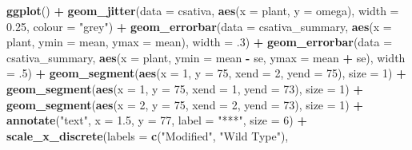 \documentclass[
]{book}
\newenvironment{Shaded}{\begin{snugshade}}{\end{snugshade}}
\newcommand{\DataTypeTok}[1]{\textcolor[rgb]{0.13,0.29,0.53}{#1}}
\newcommand{\DecValTok}[1]{\textcolor[rgb]{0.00,0.00,0.81}{#1}}
\newcommand{\FloatTok}[1]{\textcolor[rgb]{0.00,0.00,0.81}{#1}}
\newcommand{\KeywordTok}[1]{\textcolor[rgb]{0.13,0.29,0.53}{\textbf{#1}}}
\newcommand{\NormalTok}[1]{#1}
\newcommand{\OperatorTok}[1]{\textcolor[rgb]{0.81,0.36,0.00}{\textbf{#1}}}
\newcommand{\StringTok}[1]{\textcolor[rgb]{0.31,0.60,0.02}{#1}}
\begin{document}
\begin{Shaded}
\begin{Highlighting}[]
\KeywordTok{ggplot}\NormalTok{() }\OperatorTok{+}
\StringTok{  }\KeywordTok{geom_jitter}\NormalTok{(}\DataTypeTok{data =}\NormalTok{ csativa, }
              \KeywordTok{aes}\NormalTok{(}\DataTypeTok{x =}\NormalTok{ plant, }\DataTypeTok{y =}\NormalTok{ omega), }
              \DataTypeTok{width =} \FloatTok{0.25}\NormalTok{, }\DataTypeTok{colour =} \StringTok{"grey"}\NormalTok{) }\OperatorTok{+}
\StringTok{  }\KeywordTok{geom_errorbar}\NormalTok{(}\DataTypeTok{data =}\NormalTok{ csativa_summary,}
                \KeywordTok{aes}\NormalTok{(}\DataTypeTok{x =}\NormalTok{ plant,}
                    \DataTypeTok{ymin =}\NormalTok{ mean,}
                    \DataTypeTok{ymax =}\NormalTok{ mean),}
                \DataTypeTok{width =} \FloatTok{.3}\NormalTok{) }\OperatorTok{+}
\StringTok{  }\KeywordTok{geom_errorbar}\NormalTok{(}\DataTypeTok{data =}\NormalTok{ csativa_summary,}
                \KeywordTok{aes}\NormalTok{(}\DataTypeTok{x =}\NormalTok{ plant,}
                    \DataTypeTok{ymin =}\NormalTok{ mean }\OperatorTok{-}\StringTok{ }\NormalTok{se,}
                    \DataTypeTok{ymax =}\NormalTok{ mean }\OperatorTok{+}\StringTok{ }\NormalTok{se),}
                \DataTypeTok{width =} \FloatTok{.5}\NormalTok{) }\OperatorTok{+}
\StringTok{  }\KeywordTok{geom_segment}\NormalTok{(}\KeywordTok{aes}\NormalTok{(}\DataTypeTok{x =} \DecValTok{1}\NormalTok{, }\DataTypeTok{y =} \DecValTok{75}\NormalTok{, }\DataTypeTok{xend =} \DecValTok{2}\NormalTok{, }\DataTypeTok{yend =} \DecValTok{75}\NormalTok{),}
               \DataTypeTok{size =} \DecValTok{1}\NormalTok{) }\OperatorTok{+}
\StringTok{  }\KeywordTok{geom_segment}\NormalTok{(}\KeywordTok{aes}\NormalTok{(}\DataTypeTok{x =} \DecValTok{1}\NormalTok{, }\DataTypeTok{y =} \DecValTok{75}\NormalTok{, }\DataTypeTok{xend =} \DecValTok{1}\NormalTok{, }\DataTypeTok{yend =} \DecValTok{73}\NormalTok{),}
               \DataTypeTok{size =} \DecValTok{1}\NormalTok{) }\OperatorTok{+}
\StringTok{  }\KeywordTok{geom_segment}\NormalTok{(}\KeywordTok{aes}\NormalTok{(}\DataTypeTok{x =} \DecValTok{2}\NormalTok{, }\DataTypeTok{y =} \DecValTok{75}\NormalTok{, }\DataTypeTok{xend =} \DecValTok{2}\NormalTok{, }\DataTypeTok{yend =} \DecValTok{73}\NormalTok{),}
               \DataTypeTok{size =} \DecValTok{1}\NormalTok{) }\OperatorTok{+}
\StringTok{  }\KeywordTok{annotate}\NormalTok{(}\StringTok{"text"}\NormalTok{, }\DataTypeTok{x =} \FloatTok{1.5}\NormalTok{, }\DataTypeTok{y =} \DecValTok{77}\NormalTok{,  }\DataTypeTok{label =} \StringTok{"***"}\NormalTok{, }\DataTypeTok{size =} \DecValTok{6}\NormalTok{) }\OperatorTok{+}
\StringTok{  }\KeywordTok{scale_x_discrete}\NormalTok{(}\DataTypeTok{labels =} \KeywordTok{c}\NormalTok{(}\StringTok{"Modified"}\NormalTok{, }\StringTok{"Wild Type"}\NormalTok{),}

\end{Highlighting}
\end{Shaded}
\end{document}
